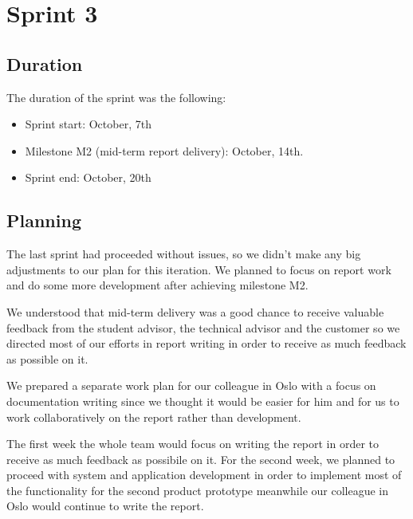 
\chapter{Sprint 3}
\label{Sprint3}

\section{Duration}
The duration of the sprint was the following:
\begin{itemize}
\item Sprint start:  October, 7th
\item Milestone M2 (mid-term report delivery): October, 14th.
\item Sprint end: October, 20th
\end{itemize}

\section{Planning}

The last sprint had proceeded without issues, so we didn't make any big adjustments
to our plan for this iteration. We planned to focus on report work and do some more development
after achieving milestone M2.

We understood that mid-term delivery was a good chance
to receive valuable feedback from the student advisor, the technical advisor and the customer
so we directed most of our efforts in report writing in order to receive as much
feedback as possible on it.

We prepared a separate work plan for our colleague in Oslo with a focus on documentation
writing since we thought it would be easier for him and for us to work collaboratively
on the report rather than development.

\iffalse
The first week the whole team would focus on writing the report
in order to receive as much feedback as possibile on it. 
For the second week, %
we planned to proceed with system and application development %
in order to implement most of the functionality for the second product prototype meanwhile
our colleague in Oslo would continue to write the report.

